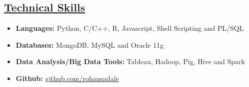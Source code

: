 \documentclass[10pt]{article}
\begin{document}
\subsection*{\underline{Technical Skills}}
\vspace{-0.1cm}
\begin{itemize}[leftmargin=*]
 \item[]  \textbf{Languages:}  Python, C/C++, R, Javascript, Shell Scripting and PL/SQL
 \vspace{-0.22cm}
 \item[]   \textbf{Databases:}  MongoDB, MySQL and Oracle 11g
  \vspace{-0.22cm}
 \item[]   \textbf{Data Analysis/Big Data Tools:} Tableau, Hadoop, Pig, Hive and Spark
 \vspace{-0.22cm}
 \item[] \textbf{Github:} \url{github.com/rohansadale}
\end{itemize}
\end{document}

